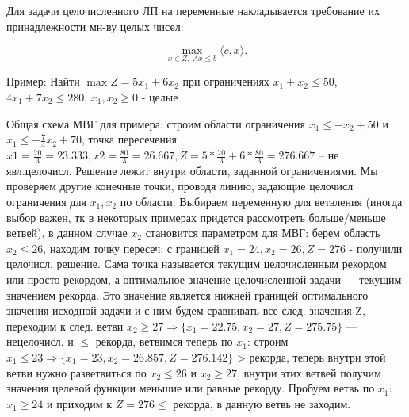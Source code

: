 Для задачи целочисленного ЛП на переменные накладывается требование их принадлежности мн-ву целых чисел:

$$\max_{x \in Z,~Ax \leqslant b} \langle c, x \rangle.$$

Пример: Найти $\max Z = 5x_1 + 6x_2$ при ограничениях $x_1+x_2 \leq 50$, $4x_1+7x_2 \leq 280$, $x_1,x_2 \geq 0$ - целые

Общая схема МВГ для примера: строим области ограничения $x_1 \leq -x_2+50$ и $x_1 \leq - \frac{7}{4}x_2+70$,
точка пересечения $x1=\frac{70}{3}=23.333, x2=\frac{80}{3}=26.667, Z=5*\frac{70}{3}+6*\frac{80}{3}=276.667$ -- не явл.целочисл. 
Решение лежит внутри области, заданной ограничениями. 
Мы проверяем другие конечные точки, проводя линию, задающие целочисл ограничения для $x_1, x_2$ по области. 
Выбираем переменную для ветвления (иногда выбор важен, тк в некоторых примерах придется рассмотреть больше/меньше ветвей), 
в данном случае $x_2$ становится параметром для МВГ: берем область $x_2 \leq 26$, находим точку пересеч. 
с границей ${x_1=24, x_2=26, Z=276}$ - получили целочисл. решение. 
Сама точка называется текущим целочисленным рекордом или просто рекордом, а оптимальное значение целочисленной задачи — текущим значением рекорда. 
Это значение является нижней границей оптимального значения исходной задачи и с ним будем сравнивать все след. значения Z, 
переходим к след. ветви $x_2 \geq 27 \Rightarrow \{x_1=22.75, x_2=27, Z=275.75\}$ --- нецелочисл. и $\leq$ рекорда, ветвимся теперь по $x_1$: 
строим $x_1 \leq 23 \Rightarrow \{x_1=23, x_2=26.857, Z=276.142 \}$ > рекорда, теперь внутри этой ветви нужно разветвиться по $x_2 \leq 26$ и $x_2 \geq 27$, 
внутри этих ветвей получим значения целевой функции меньшие или равные рекорду. 
Пробуем ветвь по $x_1:$ $x_1 \geq 24$ и приходим к $Z=276 \leq$ рекорда, в данную ветвь не заходим.



